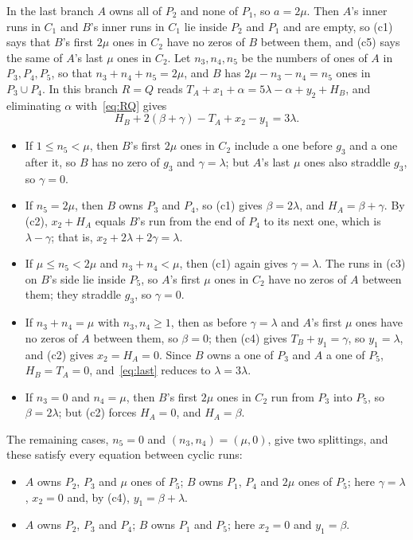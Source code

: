 \documentclass[12pt]{article}
\begin{document}
In the last branch $A$ owns all of $P_2$ and none of $P_1$, so $a = 2\mu$. Then $A$'s inner runs in $C_1$ and
$B$'s inner runs in $C_1$ lie inside $P_2$ and $P_1$ and are empty, so (c1) says that $B$'s first $2\mu$ ones
in $C_2$ have no zeros of $B$ between them, and (c5) says the same of $A$'s last $\mu$ ones in $C_2$. Let $n_3,
n_4, n_5$ be the numbers of ones of $A$ in $P_3, P_4, P_5$, so that $n_3 + n_4 + n_5 = 2\mu$, and $B$ has
$2\mu - n_3 - n_4 = n_5$ ones in $P_3 \cup P_4$. In this branch $R = Q$ reads $T_A + x_1 + \alpha =
5\lambda - \alpha + y_2 + H_B$, and eliminating $\alpha$ with~\eqref{eq:RQ} gives
\begin{equation}\label{eq:last}
H_B + 2(\beta + \gamma) - T_A + x_2 - y_1 = 3\lambda .
\end{equation}
\begin{itemize}
\item If $1 \le n_5 < \mu$, then $B$'s first $2\mu$ ones in $C_2$ include a one before $g_3$ and a one after it,
  so $B$ has no zero of $g_3$ and $\gamma = \lambda$; but $A$'s last $\mu$ ones also straddle $g_3$, so
  $\gamma = 0$.
\item If $n_5 = 2\mu$, then $B$ owns $P_3$ and $P_4$, so (c1) gives $\beta = 2\lambda$, and $H_A = \beta + \gamma$.
  By (c2), $x_2 + H_A$ equals $B$'s run from the end of $P_4$ to its next one, which is $\lambda - \gamma$; that
  is, $x_2 + 2\lambda + 2\gamma = \lambda$.
\item If $\mu \le n_5 < 2\mu$ and $n_3 + n_4 < \mu$, then (c1) again gives $\gamma = \lambda$. The runs in (c3)
  on $B$'s side lie inside $P_5$, so $A$'s first $\mu$ ones in $C_2$ have no zeros of $A$ between them; they
  straddle $g_3$, so $\gamma = 0$.
\item If $n_3 + n_4 = \mu$ with $n_3, n_4 \ge 1$, then as before $\gamma = \lambda$ and $A$'s first $\mu$ ones
  have no zeros of $A$ between them, so $\beta = 0$; then (c4) gives $T_B + y_1 = \gamma$, so $y_1 = \lambda$,
  and (c2) gives $x_2 = H_A = 0$. Since $B$ owns a one of $P_3$ and $A$ a one of $P_5$, $H_B = T_A = 0$,
  and~\eqref{eq:last} reduces to $\lambda = 3\lambda$.
\item If $n_3 = 0$ and $n_4 = \mu$, then $B$'s first $2\mu$ ones in $C_2$ run from $P_3$ into $P_5$, so $\beta =
  2\lambda$; but (c2) forces $H_A = 0$, and $H_A = \beta$.
\end{itemize}
The remaining cases, $n_5 = 0$ and $(n_3, n_4) = (\mu, 0)$, give two splittings, and these satisfy every
equation between cyclic runs:
\begin{itemize}
\item[(S1)] $A$ owns $P_2$, $P_3$ and $\mu$ ones of $P_5$; $B$ owns $P_1$, $P_4$ and $2\mu$ ones of $P_5$; here
  $\gamma = \lambda$, $x_2 = 0$ and, by (c4), $y_1 = \beta + \lambda$.
\item[(S2)] $A$ owns $P_2$, $P_3$ and $P_4$; $B$ owns $P_1$ and $P_5$; here $x_2 = 0$ and $y_1 = \beta$.
\end{itemize}
\end{document}
